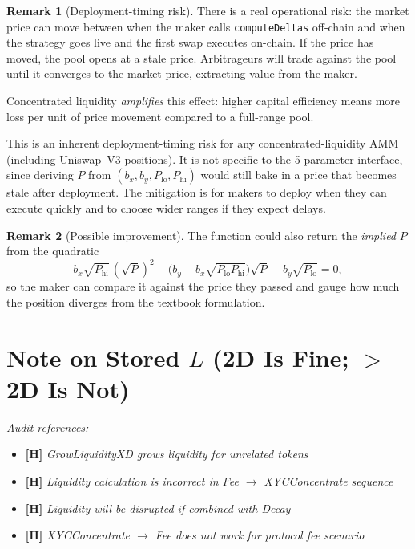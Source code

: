 \documentclass[11pt]{article}
\theoremstyle{definition}
\newtheorem{remark}{Remark}
\begin{document}
\begin{remark}[Deployment-timing risk]
There is a real operational risk: the market price can move between when the
maker calls \texttt{computeDeltas} off-chain and when the strategy goes live
and the first swap executes on-chain.
If the price has moved, the pool opens at a stale price.  Arbitrageurs will
trade against the pool until it converges to the market price, extracting
value from the maker.

Concentrated liquidity \emph{amplifies} this effect: higher capital efficiency
means more loss per unit of price movement compared to a full-range pool.

This is an inherent deployment-timing risk for any concentrated-liquidity AMM
(including Uniswap~V3 positions).  It is not specific to the 5-parameter
interface, since deriving $P$ from $(b_x, b_y, P_{\mathrm{lo}}, P_{\mathrm{hi}})$
would still bake in a price that becomes stale after deployment.
The mitigation is for makers to deploy when they can execute quickly
and to choose wider ranges if they expect delays.
\end{remark}

\begin{remark}[Possible improvement]
The function could also return the \emph{implied} $P$ from the quadratic
\[
b_x \sqrt{P_{\mathrm{hi}}}\,(\sqrt{P})^2
  - \bigl(b_y - b_x\sqrt{P_{\mathrm{lo}} P_{\mathrm{hi}}}\bigr)\sqrt{P}
  - b_y\sqrt{P_{\mathrm{lo}}} = 0,
\]
so the maker can compare it against the price they passed and gauge
how much the position diverges from the textbook formulation.
\end{remark}


\section{Note on Stored $L$ (2D Is Fine; $>$2D Is Not)}\label{sec:stored-L}

\noindent\textit{Audit references:}
\begin{itemize}[nosep,leftmargin=2em]
\item \textbf{[H]} \textit{GrowLiquidityXD grows liquidity for unrelated tokens}
\item \textbf{[H]} \textit{Liquidity calculation is incorrect in Fee $\to$ XYCConcentrate sequence}
\item \textbf{[H]} \textit{Liquidity will be disrupted if combined with Decay}
\item \textbf{[H]} \textit{XYCConcentrate $\to$ Fee does not work for protocol fee scenario}
\end{itemize}
\end{document}
